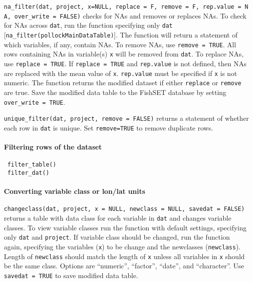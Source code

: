 \documentclass[
]{article}
\begin{document}
\texttt{na\_filter(dat,\ project,\ x=NULL,\ replace\ =\ F,\ remove\ =\ F,\ rep.value\ =\ NA,\ over\_write\ =\ FALSE)} checks for NAs and removes or replaces NAs. To check for NAs across \texttt{dat}, run the function specifying only \texttt{dat} {[}\texttt{na\_filter(pollockMainDataTable)}{]}. The function will return a statement of which variables, if any, contain NAs. To remove NAs, use \texttt{remove\ =\ TRUE}. All rows containing NAs in variable(s) \texttt{x} will be removed from \texttt{dat}. To replace NAs, use \texttt{replace\ =\ TRUE}. If \texttt{replace\ =\ TRUE} and \texttt{rep.value} is not defined, then NAs are replaced with the mean value of \texttt{x}. \texttt{rep.value} must be specified if \texttt{x} is not numeric. The function returns the modified dataset if either \texttt{replace} or \texttt{remove} are true. Save the modified data table to the FishSET database by setting \texttt{over\_write\ =\ TRUE}.

\texttt{unique\_filter(dat,\ project,\ remove\ =\ FALSE)} returns a statement of whether each row in \texttt{dat} is unique. Set \texttt{remove=TRUE} to remove duplicate rows.

\hypertarget{filtering-rows-of-the-dataset-1}{%
\paragraph{Filtering rows of the dataset}\label{filtering-rows-of-the-dataset-1}}

\begin{verbatim}
 filter_table()      
 filter_dat()     
\end{verbatim}

\hypertarget{converting-variable-class-or-lonlat-units}{%
\paragraph{Converting variable class or lon/lat units}\label{converting-variable-class-or-lonlat-units}}

\texttt{changeclass(dat,\ project,\ x\ =\ NULL,\ newclass\ =\ NULL,\ savedat\ =\ FALSE)} returns a table with data class for each variable in \texttt{dat} and changes variable classes. To view variable classes run the function with default settings, specifying only \texttt{dat} and \texttt{project}. If variable class should be changed, run the function again, specifying the variables (\texttt{x}) to be change and the newclasses (\texttt{newclass}). Length of \texttt{newclass} should match the length of \texttt{x} unless all variables in \texttt{x} should be the same class. Options are ``numeric'', ``factor'', ``date'', and ``character''. Use \texttt{savedat\ =\ TRUE} to save modified data table.
\end{document}
